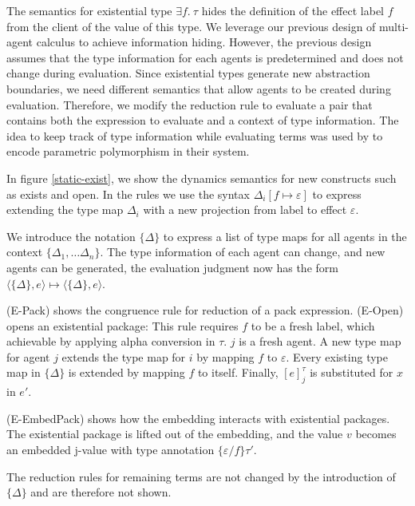 The semantics for existential type $\exists f.\ \tau$  hides the definition of the effect label $f$ from the client of the value of this type. We leverage  our previous design of multi-agent calculus to achieve information hiding. However, the previous design assumes that the type information for each agents is predetermined and does not change during evaluation. Since existential types generate new abstraction boundaries, we need different semantics that allow agents to be created during evaluation. Therefore, we modify the reduction rule to evaluate a pair that contains both the expression to evaluate and a context of type information. The idea to keep track of type information while evaluating terms was used by \citet{grossman00} to encode parametric polymorphism in their system.

In figure \ref{static-exist}, we show the dynamics semantics for new constructs such as exists and open. In the rules we use the syntax $\Delta_i[f \mapsto \varepsilon]$ to express extending the type map $\Delta_i$ with a new projection from label  to effect $\varepsilon$.

We introduce the notation $\{\Delta\}$ to express a list of type maps for all agents in the context $\{\Delta_1, \dots \Delta_n\}$. The type information of each agent can change, and new agents can be generated, the evaluation judgment now has the form $\langle \{\Delta\}, e \rangle \mapsto \langle \{\Delta\}, e \rangle$. 

(E-Pack) shows the congruence rule for reduction of a pack expression. (E-Open) opens an existential package: This rule requires $f$ to be a fresh label, which achievable by applying alpha conversion in $\tau$. $j$ is a fresh agent. A new type map for agent $j$ extends the type map for $i$ by mapping $f$ to $\varepsilon$. Every existing type map in $\{\Delta\}$ is extended by mapping $f$ to itself. Finally, $[e]^\tau_j$ is substituted for $x$ in $e'$.

(E-EmbedPack) shows how the embedding interacts with existential packages. The existential package is lifted out of the embedding, and the value $v$ becomes an embedded j-value with type annotation $\{\varepsilon/f\}\tau'$.

The reduction rules for remaining terms are not changed by the introduction of $\{\Delta\}$ and are therefore not shown. 

